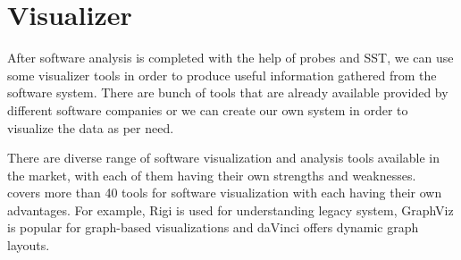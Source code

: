\section{Visualizer}\label{sec:component-visualizer}

After software analysis is completed with the help of probes and SST, we can use some visualizer tools in order to produce useful information gathered from the software system. There are bunch of tools that are already available provided by different software companies or we can create our own system in order to visualize the data as per need. 

There are diverse range of software visualization and analysis tools available in the market, with each of them having their own strengths and weaknesses.~\citep{SWVizTools2001} covers more than 40 tools for software visualization with each having their own advantages. For example, Rigi is used for understanding legacy system, GraphViz is popular for graph-based visualizations and daVinci offers dynamic graph layouts.

